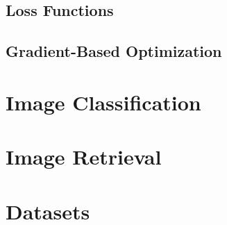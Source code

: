 \subsection{Loss Functions}
\label{subsec:back:loss}

\subsection{Gradient-Based Optimization}
\label{subsec:back:optim}


\section{Image Classification}
\label{sec:back:image-classification}




\section{Image Retrieval}
\label{sec:back:image-retrieval}


\section{Datasets}
\label{sec:back:datasets}
